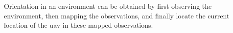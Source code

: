 Orientation in an environment can be obtained by first observing the environment, then mapping the observations, and finally locate the current location of the \acs{uav} in these mapped observations.